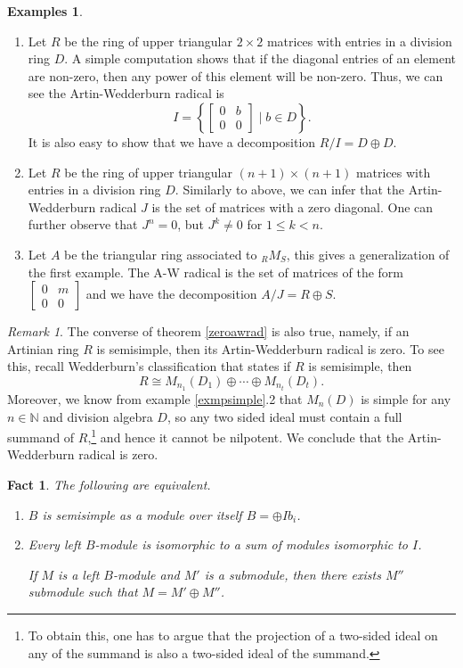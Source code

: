 \documentclass{tufte-handout} %
\newtheorem{fact}[thm]{Fact}
\theoremstyle{definition}
\newtheorem{exmps}[thm]{Examples}
\theoremstyle{remark}
\newtheorem{rem}[thm]{Remark}
\newcommand{\N}{\mathbb{N}}
\begin{document}
\begin{exmps}
	\begin{enumerate}
		\item Let $R$ be the ring of upper triangular $2\times 2$ matrices with entries in a division ring $D$. A simple computation shows that if the diagonal entries of an element are non-zero, then any power of this element will be non-zero. Thus, we can see the Artin-Wedderburn radical is \[I = \left\{\begin{bmatrix}0&b\\0&0\end{bmatrix}\mid b\in D \right\}.\]It is also easy to show that we have a decomposition $R/I = D\oplus D$.
		
		\item Let $R$ be the ring of upper triangular $(n+1)\times (n+1)$ matrices with entries in a division ring $D$. Similarly to above, we can infer that the Artin-Wedderburn radical $J$ is the set of matrices with a zero diagonal. One can further observe that $J^n = 0$, but $J^k \neq 0$ for $1\leq k < n$.
		
		\item Let $A$ be the triangular ring associated to ${}_RM_S$, this gives a generalization of the first example. The A-W radical is the set of matrices of the form $\begin{bmatrix}0&m\\0&0\end{bmatrix}$ and we have the decomposition $A/J = R \oplus S$.
	\end{enumerate}
\end{exmps}
\begin{rem}
	The converse of theorem \ref{zeroawrad} is also true, namely, if an Artinian ring $R$ is semisimple, then its Artin-Wedderburn radical is zero. To see this, recall Wedderburn's classification that states if $R$ is semisimple, then \[R \cong M_{n_1}(D_1) \oplus \cdots \oplus M_{n_t}(D_t).\] Moreover, we know from example \ref{exmpsimple}.2 that $M_{n}(D)$ is simple for any $n\in \N$ and division algebra $D$, so any two sided ideal must contain a full summand of $R$,\footnote{To obtain this, one has to argue that the projection of a two-sided ideal on any of the summand is also a two-sided ideal of the summand.} and hence it cannot be nilpotent. We conclude that the Artin-Wedderburn radical is zero.
\end{rem}

\begin{fact} %
	The following are equivalent.
	\begin{enumerate}
		\item $B$ is semisimple as a module over itself $B = \oplus Ib_i$.
		\item Every left $B$-module is isomorphic to a sum of modules isomorphic to $I$.
		
		If $M$ is a left $B$-module and $M'$ is a submodule, then there exists $M''$ submodule such that $M = M' \oplus M''$.
	\end{enumerate}
\end{fact}
\end{document}
